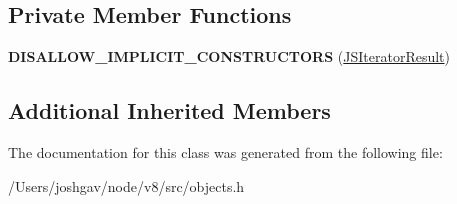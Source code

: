 \subsection*{Private Member Functions}
\begin{DoxyCompactItemize}
\item 
{\bfseries D\+I\+S\+A\+L\+L\+O\+W\+\_\+\+I\+M\+P\+L\+I\+C\+I\+T\+\_\+\+C\+O\+N\+S\+T\+R\+U\+C\+T\+O\+RS} (\hyperlink{classv8_1_1internal_1_1_j_s_iterator_result}{J\+S\+Iterator\+Result})\hypertarget{classv8_1_1internal_1_1_j_s_iterator_result_adc868ad4b4d2f752c7951726e08b731f}{}\label{classv8_1_1internal_1_1_j_s_iterator_result_adc868ad4b4d2f752c7951726e08b731f}

\end{DoxyCompactItemize}
\subsection*{Additional Inherited Members}


The documentation for this class was generated from the following file\+:\begin{DoxyCompactItemize}
\item 
/\+Users/joshgav/node/v8/src/objects.\+h\end{DoxyCompactItemize}
